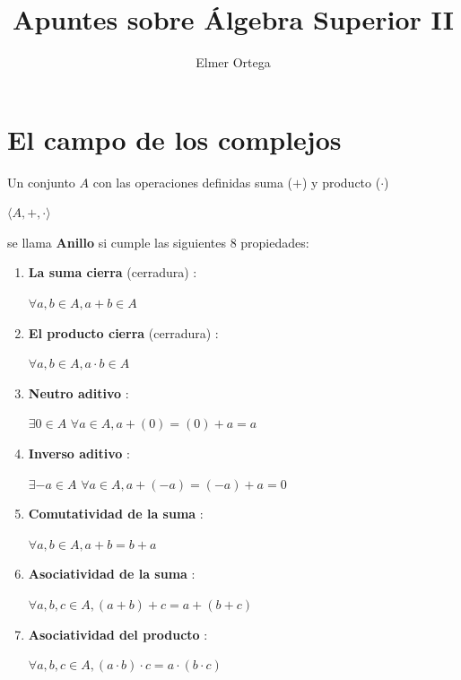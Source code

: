 \documentclass[12pt]{article}
\begin{document}
\title{Apuntes sobre Álgebra Superior II}
\author{Elmer Ortega}
\maketitle
\section*{El campo de los complejos}
\noindent Un conjunto $A$ con las operaciones definidas suma ($+$) y producto ($\cdot$)
\begin{center}
    $\langle A, +, \cdot \rangle$
\end{center}
se llama \textbf{Anillo} si cumple las siguientes 8 propiedades:
\begin{enumerate}
    \item \textbf{La suma cierra}  (cerradura) : 
    \begin{center}
        $\forall a,b \in A,  a+b\in A$
    \end{center}
    \item \textbf{El producto cierra}  (cerradura) : 
    \begin{center}
        $\forall a,b \in A,  a \cdot b\in A$
    \end{center}
    \item \textbf{Neutro aditivo} : 
    \begin{center}
        $\exists{ } 0 \in A$  $\forall a \in A, a+(0)=(0)+a=a$
    \end{center}
    \item \textbf{Inverso aditivo} : 
    \begin{center}
        $\exists -a \in A$  $\forall a \in A, a+(-a)=(-a)+a=0$
    \end{center}
    \item \textbf{Comutatividad de la suma} : 
    \begin{center}
        $\forall a,b \in A,  a+b=b+a$
    \end{center}
    \item \textbf{Asociatividad de la suma} : 
    \begin{center}
        $\forall a,b,c \in A, (a+b)+c=a+(b+c)$
    \end{center}
    \item \textbf{Asociatividad del producto} : 
    \begin{center}
        $\forall a,b,c \in A, (a\cdot b)\cdot c = a \cdot (b \cdot c)$
    \end{center}

\end{enumerate}
\end{document}
